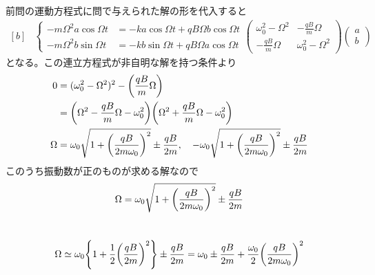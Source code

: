 \documentclass[../ap_2011.tex]{subfiles}
\begin{document}
\section{}
前問の運動方程式に問で与えられた解の形を代入すると
\begin{equation}\begin{aligned}[b]
    &\begin{cases}
        -m\Omega^2 a\cos\Omega t &= -ka\cos\Omega t + qB\Omega b\cos\Omega t\\
        -m\Omega^2 b\sin\Omega t &= -kb\sin\Omega t + qB\Omega a\cos\Omega t
    \end{cases}
    \begin{pmatrix}
        \omega_0^2-\Omega^2 & -\frac{qB}{m}\Omega\\
        -\frac{qB}{m}\Omega & \omega_0^2-\Omega^2
    \end{pmatrix}\begin{pmatrix}
        a\\b
    \end{pmatrix}
\end{aligned}\end{equation}
となる。この連立方程式が非自明な解を持つ条件より
\begin{equation}\begin{aligned}[b]
    0 &= (\omega_0^2-\Omega^2)^2-\qty(\frac{qB}{m}\Omega)\\
    &= \qty(\Omega^2-\frac{qB}{m}\Omega -\omega_0^2)\qty(\Omega^2+\frac{qB}{m}\Omega -\omega_0^2)\\
    \Omega &= \omega_0\sqrt{1+\qty(\frac{qB}{2m\omega_0})^2}\pm\frac{qB}{2m},\quad -\omega_0\sqrt{1+\qty(\frac{qB}{2m\omega_0})^2}\pm\frac{qB}{2m}
\end{aligned}\end{equation}
このうち振動数が正のものが求める解なので
\begin{equation}\begin{aligned}[b]
    \Omega = \omega_0\sqrt{1+\qty(\frac{qB}{2m\omega_0})^2}\pm\frac{qB}{2m}
\end{aligned}\end{equation}

\section{}
\begin{equation}\begin{aligned}[b]
    \Omega \simeq \omega_0\qty{1+\frac{1}{2}\qty(\frac{qB}{2m})^2}\pm\frac{qB}{2m}
    =\omega_0 \pm\frac{qB}{2m} +\frac{\omega_0}{2}\qty(\frac{qB}{2m\omega_0})^2
\end{aligned}\end{equation}
\end{document}

